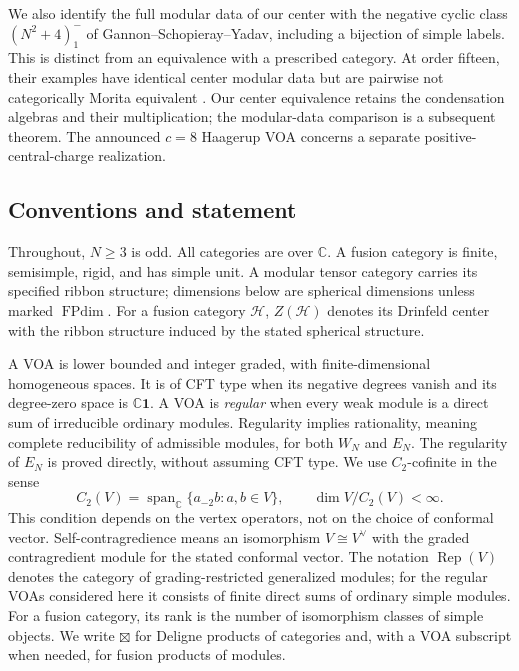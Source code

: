 \documentclass[11pt,a4paper]{article}
\numberwithin{equation}{section}
\theoremstyle{definition}\newtheorem{definition}[theorem]{Definition}
\theoremstyle{remark}\newtheorem{remark}[theorem]{Remark}
\begin{document}
We also identify the full modular data of our center with the
negative cyclic class $(N^2+4)^-_1$ of Gannon--Schopieray--Yadav,
including a bijection of simple labels. This is distinct from an
equivalence with a prescribed category. At order fifteen, their
examples have identical center modular data but are pairwise not
categorically Morita equivalent \cite[Corollary 5.9]{gsy}.
Our center equivalence retains the condensation algebras and their
multiplication; the modular-data comparison is a subsequent theorem.
The announced $c=8$ Haagerup VOA \cite{riesenc8} concerns a separate
positive-central-charge realization.

\subsection{Conventions and statement}

Throughout, $N\geq3$ is odd. All categories are over $\mathbb C$. A fusion category is finite,
semisimple, rigid, and has simple unit. A modular tensor category carries
its specified ribbon structure; dimensions below are spherical dimensions
unless marked $\operatorname{FPdim}$. For a fusion category $\mathcal H$,
$Z(\mathcal H)$ denotes its Drinfeld center with the ribbon structure
induced by the stated spherical structure.

A VOA is lower bounded and integer graded, with finite-dimensional
homogeneous spaces. It is of CFT type when its negative degrees vanish
and its degree-zero space is $\mathbb C\mathbf1$. A VOA is \emph{regular}
when every weak module is a direct sum of irreducible ordinary modules.
Regularity implies rationality, meaning complete reducibility of
admissible modules, for both $W_N$ and $E_N$. The regularity of $E_N$
is proved directly, without assuming CFT type. We use $C_2$-cofinite
in the sense
\[
 C_2(V)=\operatorname{span}_{\mathbb C}\{a_{-2}b:a,b\in V\},
 \qquad \dim V/C_2(V)<\infty.
\]
This condition depends on the vertex operators, not on the choice
of conformal vector. Self-contragredience means an isomorphism
$V\cong V^\vee$ with the graded contragredient module for the stated
conformal vector. The notation $\operatorname{Rep}(V)$ denotes the
category of grading-restricted generalized modules; for the regular
VOAs considered here it consists of finite direct sums of ordinary
simple modules.
For a fusion category, its rank is the number of isomorphism classes of
simple objects. We write $\boxtimes$ for Deligne products of categories
and, with a VOA subscript when needed, for fusion products of modules.
\end{document}
